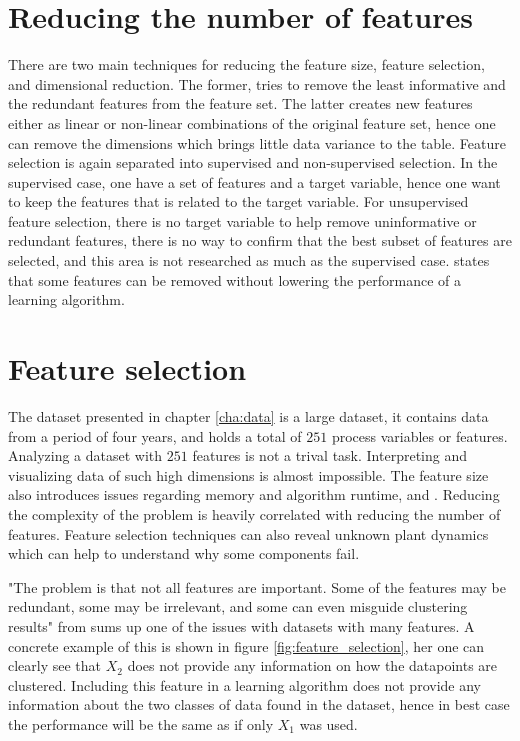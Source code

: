 \section{Reducing the number of features}\label{sec:reduce_features}
    
    There are two main techniques for reducing the feature size, feature selection, and dimensional reduction. The former, tries to remove the least informative and the redundant features from the feature set. The latter creates new features either as linear or non-linear combinations of the original feature set, hence one can remove the dimensions which brings little data variance to the table. Feature selection is again separated into supervised and non-supervised selection. In the supervised case, one have a set of features and a target variable, hence one want to keep the features that is related to the target variable. For unsupervised feature selection, there is no target variable to help remove uninformative or redundant features, there is no way to confirm that the best subset of features are selected, and this area is not researched as much as the supervised case. \cite{Liu2010} states that some features can be removed without lowering the performance of a learning algorithm. 
    
    
\section{Feature selection}\label{sec:feature_selec}
    The dataset presented in chapter \ref{cha:data} is a large dataset, it contains data from a period of four years, and holds a total of $251$ process variables or features. Analyzing a dataset with $251$ features is not a trival task. Interpreting and visualizing data of such high dimensions is almost impossible. The feature size also introduces issues regarding memory and algorithm runtime, \cite{Guyon2003} and \cite{Dy2004}. Reducing the complexity of the problem is heavily correlated with reducing the number of features. Feature selection techniques can also reveal unknown plant dynamics which can help to understand why some components fail.
    
    "The problem is that not all features are important. Some of the features may be redundant, some may be irrelevant, and some can even misguide clustering results" from \cite{Dy2004} sums up one of the issues with datasets with many features. A concrete example of this is shown in figure \ref{fig:feature_selection}, her one can clearly see that $X_2$ does not provide any information on how the datapoints are clustered. Including this feature in a learning algorithm does not provide any information about the two classes of data found in the dataset, hence in best case the performance will be the same as if only $X_1$ was used.  
    

